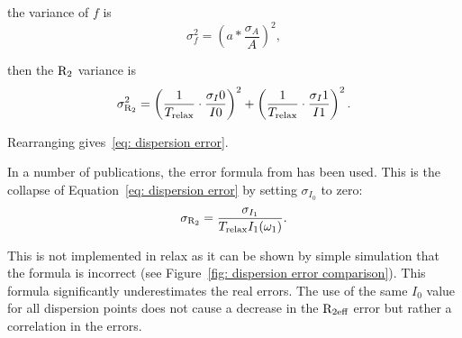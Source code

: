 the variance of $f$ is
\begin{equation}
    \sigma_f^2 = \left( a * \frac{\sigma_A}{A} \right)^2 ,
\end{equation}

then the $\mathrm{R}_2$ variance is
\begin{equation}
    \sigma_{\mathrm{R}_2}^2 = \left( \frac{1}{T_{\textrm{relax}}} \cdot \frac{\sigma_I0}{I0} \right)^2 + \left( \frac{1}{T_{\textrm{relax}}} \cdot \frac{\sigma_I1}{I1} \right)^2.
\end{equation}

Rearranging gives~\ref{eq: dispersion error}.

In a number of publications, the error formula from \citet{IshimaTorchia05} has been used.
This is the collapse of Equation~\ref{eq: dispersion error} by setting $\sigma_{I_0}$ to zero:
\begin{equation} \label{eq: IT05 dispersion error}
    \sigma_{\mathrm{R}_2} = \frac{\sigma_{I_1}}{T_{\textrm{relax}} I_1(\omega_1)} .
\end{equation}

This is not implemented in relax as it can be shown by simple simulation that the formula is incorrect (see Figure~\ref{fig: dispersion error comparison}).
This formula significantly underestimates the real errors.
The use of the same $I_0$ value for all dispersion points does not cause a decrease in the $\mathrm{R}_{\textrm{2eff}}$ error but rather a correlation in the errors.

